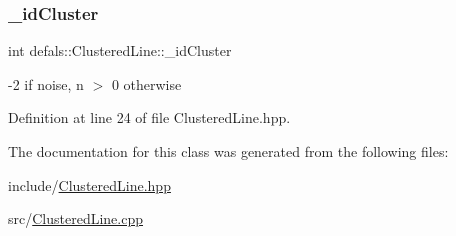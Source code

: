 \subsubsection{\texorpdfstring{\+\_\+id\+Cluster}{\_idCluster}}
{\footnotesize\ttfamily int defals\+::\+Clustered\+Line\+::\+\_\+id\+Cluster\hspace{0.3cm}{\ttfamily [private]}}

-\/2 if noise, n $>$ 0 otherwise 

Definition at line 24 of file Clustered\+Line.\+hpp.



The documentation for this class was generated from the following files\+:\begin{DoxyCompactItemize}
\item 
include/\hyperlink{_clustered_line_8hpp}{Clustered\+Line.\+hpp}\item 
src/\hyperlink{_clustered_line_8cpp}{Clustered\+Line.\+cpp}\end{DoxyCompactItemize}
